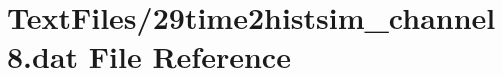 \hypertarget{29time2histsim__channel8_8dat}{}\section{Text\+Files/29time2histsim\+\_\+channel8.dat File Reference}
\label{29time2histsim__channel8_8dat}
